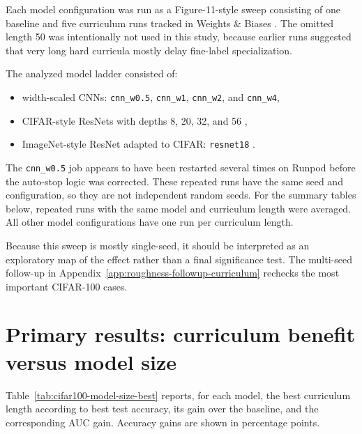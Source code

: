 Each model configuration was run as a Figure-11-style sweep consisting of one
baseline and five curriculum runs tracked in Weights \& Biases
\cite{biewald2020experiment}. The omitted length 50 was intentionally not used
in this study, because earlier runs suggested that very long hard curricula
mostly delay fine-label specialization.

The analyzed model ladder consisted of:

\begin{itemize}
    \item width-scaled CNNs: \texttt{cnn\_w0.5}, \texttt{cnn\_w1},
          \texttt{cnn\_w2}, and \texttt{cnn\_w4},
    \item CIFAR-style ResNets with depths 8, 20, 32, and 56 \cite{he2016deep},
    \item ImageNet-style ResNet adapted to CIFAR: \texttt{resnet18}
          \cite{he2016deep}.
\end{itemize}

The \texttt{cnn\_w0.5} job appears to have been restarted several times on
Runpod before the auto-stop logic was corrected. These repeated runs have the
same seed and configuration, so they are not independent random seeds. For the
summary tables below, repeated runs with the same model and curriculum length
were averaged. All other model configurations have one run per curriculum
length.

Because this sweep is mostly single-seed, it should be interpreted as an
exploratory map of the effect rather than a final significance test. The
multi-seed follow-up in Appendix~\ref{app:roughness-followup-curriculum}
rechecks the most important CIFAR-100 cases.

\section{Primary results: curriculum benefit versus model size}

Table~\ref{tab:cifar100-model-size-best} reports, for each model, the best
curriculum length according to best test accuracy, its gain over the baseline,
and the corresponding AUC gain. Accuracy gains are shown in percentage points.

